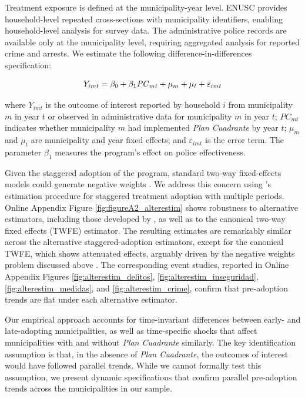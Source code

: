 Treatment exposure is defined at the municipality-year level. ENUSC provides household-level repeated cross-sections with municipality identifiers, enabling household-level analysis for survey data. The administrative police records are available only at the municipality level, requiring aggregated analysis for reported crime and arrests. We estimate the following difference-in-differences specification:

\begin{equation}
Y_{imt}= \beta_0 + \beta_{1} \mbox{\textit{PC}}_{mt} +  \mu_{m}   +      \mu_{t} +  \varepsilon_{imt}
\label{eq:main}
\end{equation}

\noindent where $Y_{imt}$ is the outcome of interest reported by household $i$ from municipality $m$ in year $t$ or observed in administrative data for municipality $m$ in year $t$; $PC_{mt}$ indicates whether municipality $m$ had implemented \emph{Plan Cuadrante} by year $t$; $\mu_m$ and $\mu_t$ are municipality and year fixed effects; and $\varepsilon_{imt}$ is the error term. The parameter $\beta_{1}$ measures the program's effect on police effectiveness.

Given the staggered adoption of the program, standard two-way fixed-effects models could generate negative weights \citep{GoodmanBacon}. We address this concern using \citet{Callaway}'s estimation procedure for staggered treatment adoption with multiple periods. 
Online Appendix Figure \ref{fig:figureA2_alterestim} shows robustness to alternative estimators, including those developed by \citet{Chaisemartin, Gardner, wooldridge2023simple}, as well as to the canonical two-way fixed effects (TWFE) estimator. The resulting estimates are remarkably similar across the alternative staggered-adoption estimators, except for the canonical TWFE, which shows attenuated effects, arguably driven by the negative weights problem discussed above \citep{GoodmanBacon}. The corresponding event studies, reported in Online Appendix Figures \ref{fig:alterestim_delitos}, \ref{fig:alterestim_inseguridad}, \ref{fig:alterestim_medidas}, and \ref{fig:alterestim_crime}, confirm that pre-adoption trends are flat under each alternative estimator.

Our empirical approach accounts for time-invariant differences between early- and late-adopting municipalities, as well as time-specific shocks that affect municipalities with and without \emph{Plan Cuadrante} similarly. The key identification assumption is that, in the absence of \emph{Plan Cuadrante}, the outcomes of interest would have followed parallel trends. While we cannot
formally test this assumption, we present dynamic specifications that confirm parallel pre-adoption trends across the municipalities in our sample. 

